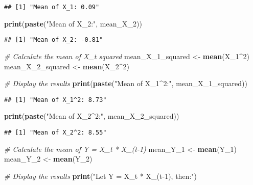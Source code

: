\documentclass[
]{article}
\newenvironment{Shaded}{\begin{snugshade}}{\end{snugshade}}
\newcommand{\CommentTok}[1]{\textcolor[rgb]{0.56,0.35,0.01}{\textit{#1}}}
\newcommand{\DecValTok}[1]{\textcolor[rgb]{0.00,0.00,0.81}{#1}}
\newcommand{\FunctionTok}[1]{\textcolor[rgb]{0.13,0.29,0.53}{\textbf{#1}}}
\newcommand{\NormalTok}[1]{#1}
\newcommand{\OtherTok}[1]{\textcolor[rgb]{0.56,0.35,0.01}{#1}}
\newcommand{\SpecialCharTok}[1]{\textcolor[rgb]{0.81,0.36,0.00}{\textbf{#1}}}
\newcommand{\StringTok}[1]{\textcolor[rgb]{0.31,0.60,0.02}{#1}}
\begin{document}
\begin{verbatim}
## [1] "Mean of X_1: 0.09"
\end{verbatim}

\begin{Shaded}
\begin{Highlighting}[]
\FunctionTok{print}\NormalTok{(}\FunctionTok{paste}\NormalTok{(}\StringTok{"Mean of X\_2:"}\NormalTok{, mean\_X\_2))}
\end{Highlighting}
\end{Shaded}

\begin{verbatim}
## [1] "Mean of X_2: -0.81"
\end{verbatim}

\begin{Shaded}
\begin{Highlighting}[]
\CommentTok{\# Calculate the mean of X\_t squared}
\NormalTok{mean\_X\_1\_squared }\OtherTok{\textless{}{-}} \FunctionTok{mean}\NormalTok{(X\_1}\SpecialCharTok{\^{}}\DecValTok{2}\NormalTok{)}
\NormalTok{mean\_X\_2\_squared }\OtherTok{\textless{}{-}} \FunctionTok{mean}\NormalTok{(X\_2}\SpecialCharTok{\^{}}\DecValTok{2}\NormalTok{)}

\CommentTok{\# Display the results}
\FunctionTok{print}\NormalTok{(}\FunctionTok{paste}\NormalTok{(}\StringTok{"Mean of X\_1\^{}2:"}\NormalTok{, mean\_X\_1\_squared))}
\end{Highlighting}
\end{Shaded}

\begin{verbatim}
## [1] "Mean of X_1^2: 8.73"
\end{verbatim}

\begin{Shaded}
\begin{Highlighting}[]
\FunctionTok{print}\NormalTok{(}\FunctionTok{paste}\NormalTok{(}\StringTok{"Mean of X\_2\^{}2:"}\NormalTok{, mean\_X\_2\_squared))}
\end{Highlighting}
\end{Shaded}

\begin{verbatim}
## [1] "Mean of X_2^2: 8.55"
\end{verbatim}

\begin{Shaded}
\begin{Highlighting}[]
\CommentTok{\# Calculate the mean of Y = X\_t * X\_(t{-}1)}
\NormalTok{mean\_Y\_1 }\OtherTok{\textless{}{-}} \FunctionTok{mean}\NormalTok{(Y\_1)}
\NormalTok{mean\_Y\_2 }\OtherTok{\textless{}{-}} \FunctionTok{mean}\NormalTok{(Y\_2)}

\CommentTok{\# Display the results}
\FunctionTok{print}\NormalTok{(}\StringTok{"Let Y = X\_t * X\_(t{-}1), then:"}\NormalTok{)}
\end{Highlighting}
\end{Shaded}
\end{document}
